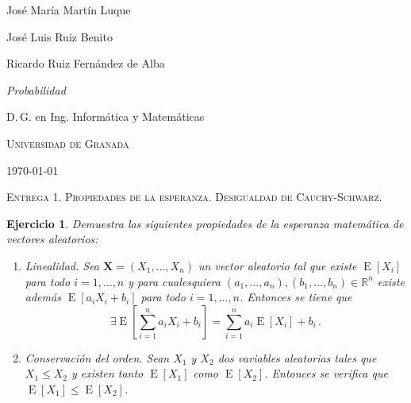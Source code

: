 \documentclass[
  a4paper,
  spanish,
  12pt,
]{scrartcl}
\theoremstyle{ejercicio-style}
\newtheorem{ejer}{Ejercicio}
\theoremstyle{remark-style}
\begin{document}
\begin{flushright}
  José María Martín Luque
  
  José Luis Ruiz Benito

  Ricardo Ruiz Fernández de Alba
  \vspace{.5em}

  \textit{Probabilidad}

  D.\,G. en Ing. Informática y Matemáticas

  \textsc{Universidad de Granada}\vspace{.5em}

  \today\vspace{.5em}
\end{flushright}

\begin{flushleft}
  \scshape\Large Entrega 1. Propiedades de la esperanza. Desigualdad de Cauchy-Schwarz.
\end{flushleft}

\begin{ejer}
  Demuestra las siguientes propiedades de la esperanza matemática de vectores aleatorios: \begin{enumerate}
    \item Linealidad. Sea \(\symbf{X} = (X_1, \dots, X_n)\) un vector aleatorio tal que existe \(\operatorname{E}[X_i]\) para todo \(i = 1, \dots, n\) y para cualesquiera \((a_1, \dots, a_n), (b_1, \dots, b_n) \in \mathbb R^n\) existe además \(\operatorname{E}[a_iX_i + b_i]\) para todo \(i = 1, \dots, n\). 
    Entonces se tiene que \[
      \exists \operatorname{E}\left[\sum_{i=1}^n a_iX_i + b_i\right] =  \sum_{i=1}^{n}a_i \operatorname{E}[X_i] + b_i\,.
    \]
    \item Conservación del orden. Sean \(X_1\) y \(X_2\) dos variables aleatorias tales que \(X_1 \leq X_2\) y existen tanto \(\operatorname{E}[X_1]\) como \(\operatorname{E}[X_2]\). 
    Entonces se verifica que \(\operatorname{E}[X_1] \leq \operatorname{E}[X_2]\).
  \end{enumerate}
\end{ejer}
\end{document}
